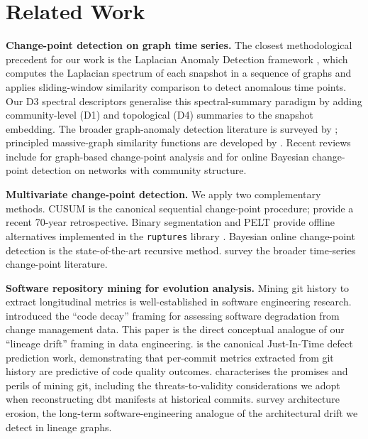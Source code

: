 \documentclass[11pt,a4paper]{article}
\begin{document}
\section{Related Work}

\textbf{Change-point detection on graph time series.}
The closest methodological precedent for our work is the Laplacian
Anomaly Detection framework \citep{huang2020laplacian,huang2024multilad},
which computes the Laplacian spectrum of each snapshot in a sequence of
graphs and applies sliding-window similarity comparison to detect
anomalous time points. Our D3 spectral descriptors generalise this
spectral-summary paradigm by adding community-level (D1) and topological
(D4) summaries to the snapshot embedding. The broader graph-anomaly
detection literature is surveyed by \citet{akoglu2015graph}; principled
massive-graph similarity functions are developed by
\citet{koutra2016deltacon}. Recent reviews include
\citet{chen2024graph} for graph-based change-point analysis and
\citet{sannapassino2025online} for online Bayesian change-point detection
on networks with community structure.

\textbf{Multivariate change-point detection.}
We apply two complementary methods. CUSUM \citep{page1954continuous} is
the canonical sequential change-point procedure; \citet{aue2024state}
provide a recent 70-year retrospective. Binary segmentation and PELT
\citep{killick2012optimal} provide offline alternatives implemented in
the \texttt{ruptures} library \citep{truong2020selective}. Bayesian
online change-point detection \citep{adams2007bayesian} is the
state-of-the-art recursive method. \citet{aminikhanghahi2017survey}
survey the broader time-series change-point literature.

\textbf{Software repository mining for evolution analysis.}
Mining git history to extract longitudinal metrics is well-established
in software engineering research. \citet{eick2001does} introduced the
``code decay'' framing for assessing software degradation from change
management data. This paper is the direct conceptual analogue of our
``lineage drift'' framing in data engineering.
\citet{kamei2013large} is the canonical Just-In-Time defect prediction
work, demonstrating that per-commit metrics extracted from git history
are predictive of code quality outcomes. \citet{bird2009promises}
characterises the promises and perils of mining git, including the
threats-to-validity considerations we adopt when reconstructing dbt
manifests at historical commits. \citet{li2022understanding} survey
architecture erosion, the long-term software-engineering analogue of
the architectural drift we detect in lineage graphs.
\end{document}
